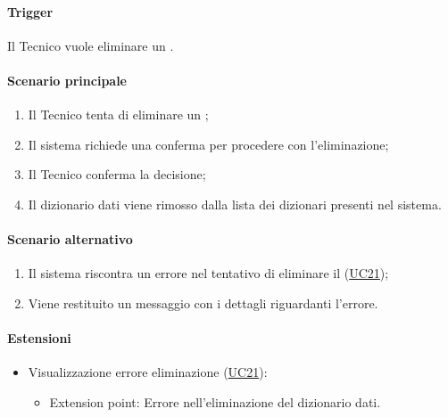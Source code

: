 \paragraph*{Trigger}
Il Tecnico vuole eliminare un .

\paragraph*{Scenario principale}
\begin{enumerate}
  \item Il Tecnico tenta di eliminare un ;
  \item Il sistema richiede una conferma per procedere con l'eliminazione;
  \item Il Tecnico conferma la decisione;
  \item Il dizionario dati viene rimosso dalla lista dei dizionari presenti nel sistema.  
\end{enumerate}

\paragraph*{Scenario alternativo}
\begin{enumerate}
  \item Il sistema riscontra un errore nel tentativo di eliminare il  (\hyperref[UC21]{UC21});
  \item Viene restituito un messaggio con i dettagli riguardanti l'errore.
\end{enumerate}


\paragraph*{Estensioni}
\begin{itemize}
  \item Visualizzazione errore eliminazione  (\hyperref[UC21]{UC21}):
  \begin{itemize}
    \item Extension point: Errore nell'eliminazione del dizionario dati.
  \end{itemize}
\end{itemize}